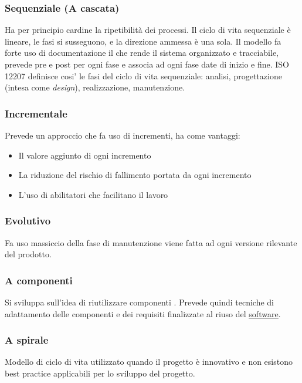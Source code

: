 		\subsubsection{Sequenziale (A cascata)}
			Ha per principio cardine la ripetibilità dei processi.
			Il ciclo di vita sequenziale è lineare, le fasi si susseguono, e la direzione
			ammessa è una sola.
			Il modello fa forte uso di documentazione il che rende il sistema organizzato e tracciabile, prevede pre e post per ogni fase e associa ad ogni fase date di inizio e fine.
ISO 12207 definisce cosi' le fasi del ciclo di vita sequenziale: analisi, progettazione (intesa come \textit{design}), realizzazione, manutenzione.

		\subsubsection{Incrementale}
			Prevede un approccio che fa uso di incrementi, ha come vantaggi:
			\begin{itemize}
			\item Il valore aggiunto di ogni incremento
			\item La riduzione del rischio di fallimento portata da ogni incremento
			\item L'uso di abilitatori che facilitano il lavoro
			\end{itemize}

		\subsubsection{Evolutivo}
			Fa uso massiccio della fase di manutenzione viene fatta ad ogni versione rilevante del prodotto.

		\subsubsection{A componenti}
			Si sviluppa sull'idea di riutilizzare componenti . Prevede quindi tecniche di adattamento delle componenti e dei requisiti finalizzate al riuso del \underline{\hyperref[sec:prodottosoftware]{software}}.

		\subsubsection{A spirale}
				Modello di ciclo di vita utilizzato quando il progetto è innovativo e non esistono best practice applicabili per lo sviluppo del progetto.

